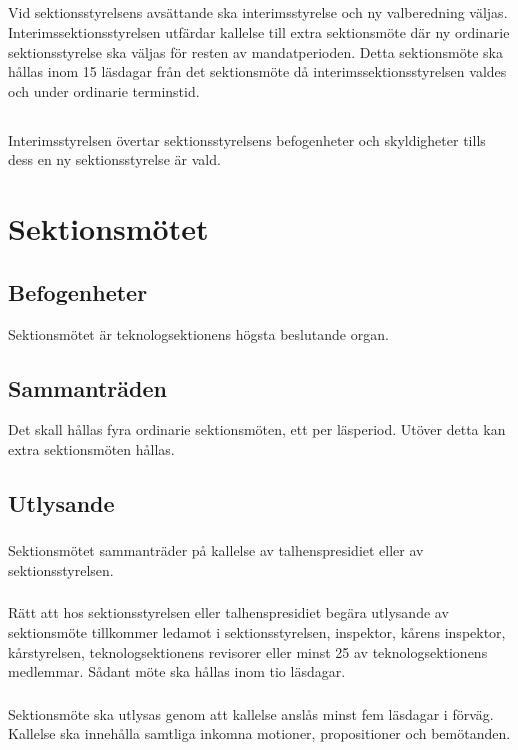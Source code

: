 \documentclass[a4paper]{dtek}
\begin{document}
\subsection{}
Vid sektionsstyrelsens avsättande ska interimsstyrelse och ny valberedning väljas.
Interimssektionsstyrelsen utfärdar kallelse till extra sektionsmöte där ny ordinarie
sektionsstyrelse ska väljas för resten av mandatperioden. Detta sektionsmöte ska
hållas inom 15 läsdagar från det sektionsmöte då interimssektionsstyrelsen valdes
och under ordinarie terminstid.
\subsection{}
Interimsstyrelsen övertar sektionsstyrelsens befogenheter och skyldigheter tills dess
en ny sektionsstyrelse är vald.

\section{Sektionsmötet}
\subsection{Befogenheter}
Sektionsmötet är teknologsektionens högsta beslutande organ.
\subsection{Sammanträden}
Det skall hållas fyra ordinarie sektionsmöten, ett per läsperiod. Utöver detta kan extra sektionsmöten hållas.
\subsection{Utlysande}
\subsubsection{}
Sektionsmötet sammanträder på kallelse av talhenspresidiet eller av sektionsstyrelsen.
\subsubsection{}
Rätt att hos sektionsstyrelsen eller talhenspresidiet begära utlysande av sektionsmöte tillkommer ledamot i sektionsstyrelsen, inspektor, kårens inspektor, kårstyrelsen, teknologsektionens revisorer eller minst 25 av teknologsektionens medlemmar. Sådant möte ska hållas inom tio läsdagar.
\subsubsection{}
\label{sec:sektionsmote_utlysande}
Sektionsmöte ska utlysas genom att kallelse anslås minst fem läsdagar i förväg.
Kallelse ska innehålla samtliga inkomna motioner, propositioner och bemötanden.
\end{document}
